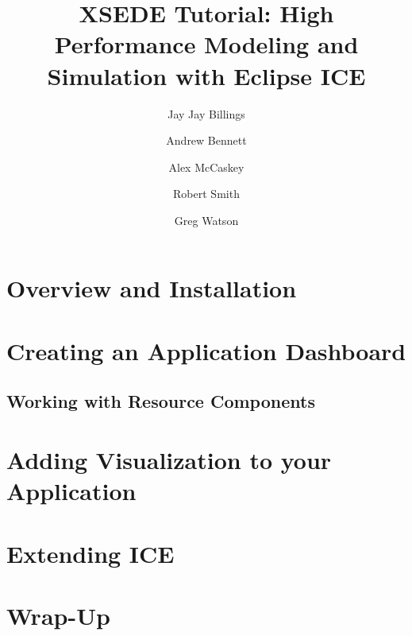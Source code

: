 \documentclass{report}
\begin{document}
\title{XSEDE Tutorial: High Performance Modeling and Simulation with Eclipse ICE}
\author{Jay Jay Billings}
\author{Andrew Bennett}
\author{Alex McCaskey}
\author{Robert Smith}
\author{Greg Watson}
\maketitle{} 

\chapter{Overview and Installation}
\graphicspath{{../../installation/src/}}


\chapter{Creating an Application Dashboard}
\graphicspath{{../../newItemGeneration/src/}}


\section{Working with Resource Components}
\graphicspath{{../../resourceComponents/src/}}


\chapter{Adding Visualization to your Application}
\graphicspath{{../../geometryEditor/src/}}


\graphicspath{{../../meshEditor/src/}}


\graphicspath{{../../visualization/src/}}


\chapter{Extending ICE}
\graphicspath{{../../scripting/src/}}
\lstset{inputpath=../../scripting/src/}


\chapter{Wrap-Up}
\end{document}
